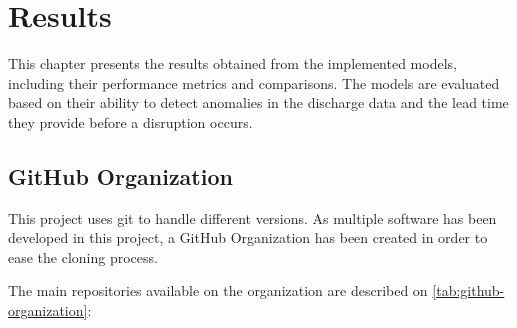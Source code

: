 \chapter{Results}\label{sec:cap4}

This chapter presents the results obtained from the implemented models, including their performance metrics and comparisons. The models are evaluated based on their ability to detect anomalies in the discharge data and the lead time they provide before a disruption occurs.

\section{GitHub Organization}

This project uses git to handle different versions. As multiple software has been developed in this project, a GitHub Organization has been created in order to ease the cloning process.

The main repositories available on the organization are described on \autoref{tab:github-organization}:

